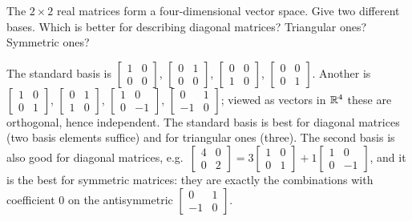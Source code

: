 \begin{exercise}\label{exr:u35-matrices}
The $2\times2$ real matrices form a four-dimensional vector space. Give two different bases. Which
is better for describing diagonal matrices? Triangular ones? Symmetric ones?
\end{exercise}
\begin{solution}
The standard basis is $\left[\begin{smallmatrix}1&0\\0&0\end{smallmatrix}\right]$,
$\left[\begin{smallmatrix}0&1\\0&0\end{smallmatrix}\right]$, $\left[\begin{smallmatrix}0&0\\1&0\end{smallmatrix}\right]$,
$\left[\begin{smallmatrix}0&0\\0&1\end{smallmatrix}\right]$. Another is
$\left[\begin{smallmatrix}1&0\\0&1\end{smallmatrix}\right]$, $\left[\begin{smallmatrix}0&1\\1&0\end{smallmatrix}\right]$,
$\left[\begin{smallmatrix}1&0\\0&-1\end{smallmatrix}\right]$, $\left[\begin{smallmatrix}0&1\\-1&0\end{smallmatrix}\right]$; viewed as
vectors in $\mathbb{R}^4$ these are orthogonal, hence independent. The standard basis is best for
diagonal matrices (two basis elements suffice) and for triangular ones (three). The second basis
is also good for diagonal matrices, e.g.\ $\left[\begin{smallmatrix}4&0\\0&2\end{smallmatrix}\right]
=3\left[\begin{smallmatrix}1&0\\0&1\end{smallmatrix}\right]+1\left[\begin{smallmatrix}1&0\\0&-1\end{smallmatrix}\right]$, and it is the
best for symmetric matrices: they are exactly the combinations with coefficient $0$ on the
antisymmetric $\left[\begin{smallmatrix}0&1\\-1&0\end{smallmatrix}\right]$.
\end{solution}

